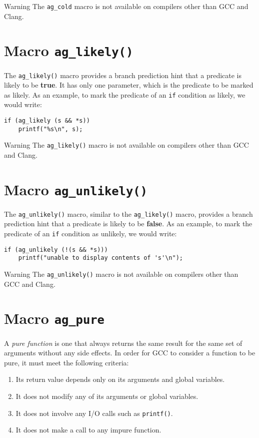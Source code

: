 \begin{bclogo}[logo=\bctakecare, noborder=true, couleurBarre=orange]{Warning}
  The \verb|ag_cold| macro is not available on compilers other than GCC and 
  Clang.
\end{bclogo}


\section{Macro \texttt{ag\_likely()}}
The \verb|ag_likely()| macro provides a branch prediction hint that a predicate
is likely to be \textbf{true}. It has only one parameter, which is the predicate 
to be marked as likely. As an example, to mark the predicate of an \verb|if| 
condition as likely, we would write:
\begin{lstlisting}[linewidth=1.0\linewidth]
if (ag_likely (s && *s)) 
    printf("%s\n", s);
\end{lstlisting}

\begin{bclogo}[logo=\bctakecare, noborder=true, couleurBarre=orange]{Warning}
  The \verb|ag_likely()| macro is not available on compilers other than GCC and 
  Clang.
\end{bclogo}


\section{Macro \texttt{ag\_unlikely()}}
The \verb|ag_unlikely()| macro, similar to the \verb|ag_likely()| macro,
provides a branch prediction hint that a predicate is likely to be 
\textbf{false}. As an example, to mark the predicate of an \verb|if| condition 
as unlikely, we would write:
\begin{lstlisting}[linewidth=1.0\linewidth]
if (ag_unlikely (!(s && *s))) 
    printf("unable to display contents of 's'\n");
\end{lstlisting}

\begin{bclogo}[logo=\bctakecare, noborder=true, couleurBarre=orange]{Warning}
  The \verb|ag_unlikely()| macro is not available on compilers other than GCC 
  and Clang.
\end{bclogo}




\section{Macro \texttt{ag\_pure}}
A \emph{pure function} is one that always returns the same result for the same
set of arguments without any side effects. In order for GCC to consider a
function to be pure, it must meet the following criteria:
\begin{enumerate}
  \item Its return value depends only on its arguments and global variables.
  \item It does not modify any of its arguments or global variables.
  \item It does not involve any I/O calls such as \texttt{printf()}.
  \item It does not make a call to any impure function.
\end{enumerate}

